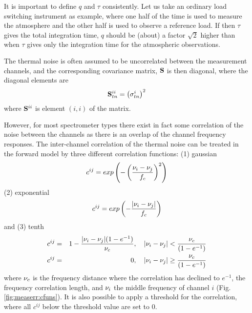 It is important to define $q$ and $\tau$ consistently. Let us take an
 ordinary load switching instrument as example, where one half of the
 time is used to measure the atmosphere and the other half is used to
 observe a reference load. If then $\tau$ gives the total integration
 time, $q$ should be (about) a factor $\sqrt{2}$ higher than when $\tau$
 gives only the integration time for the atmospheric observations.
 
 The thermal noise is often assumed to be uncorrelated between the
 measurement channels, and the corresponding covariance matrix,
 $\mathbf{S}$ is then diagonal, where the diagonal elements are
 \begin{equation}
   \mathbf{S}_{tn}^{ii} = \left( \sigma_{tn}^i \right)^2
  \label{eq:measerr:Stn_diag}
 \end{equation}
 where $\mathbf{S}^{ii}$ is element $(i,i)$ of the matrix.
 
 However, for most spectrometer types there exist in fact some
 correlation of the noise between the channels as there is an overlap
 of the channel frequency responses.  The inter-channel correlation of
 the thermal noise can be treated in the forward model by three
 different correlation functions: (1) gaussian
 \begin{equation}
  c^{ij} = exp\left(-\left(\frac{\nu_i-\nu_j}{f_c}\right)^2\right)
 \end{equation}
 (2) exponential
 \begin{equation}
  c^{ij} = exp\left(-\frac{|\nu_i-\nu_j|}{f_c}\right)
 \end{equation}
 and (3) tenth
 \begin{eqnarray}
  c^{ij} &=& 1-\frac{|\nu_i-\nu_j|(1-e^{-1})}{\nu_c}, \quad 
            |\nu_i-\nu_j| < \frac{\nu_c}{(1-e^{-1})} \nonumber \\
  c^{ij} &=& 0, \quad |\nu_i-\nu_j| \geq \frac{\nu_c}{(1-e^{-1})}
 \end{eqnarray}
 where $\nu_c$ is the frequency distance where the correlation has
 declined to $e^{-1}$, the frequency correlation length, and $\nu_i$
 the middle frequency of channel $i$ (Fig. \ref{fig:measerr:cfuns}).
 It is also possible to apply a threshold for the correlation, where
 all $c^{ij}$ below the threshold value are set to 0.

